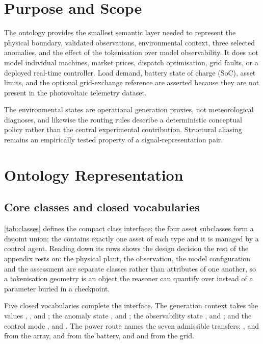 \section{Purpose and Scope}

The ontology provides the smallest semantic layer needed to represent the physical boundary, validated observations, environmental context, three selected anomalies, and the effect of the tokenisation over model observability. It does not model individual machines, market prices, dispatch optimisation, grid faults, or a deployed real-time controller. Load demand, battery state of charge (SoC), asset limits, and the optional grid-exchange reference are asserted because they are not present in the photovoltaic telemetry dataset.

The environmental states are operational generation proxies, not meteorological diagnoses, and likewise the routing rules describe a deterministic conceptual policy rather than the central experimental contribution. Structural aliasing remains an empirically tested property of a signal-representation pair.

\section{Ontology Representation}

\subsection{Core classes and closed vocabularies}

\autoref{tab:classes} defines the compact class interface: the four asset subclasses form a disjoint union; the  contains exactly one asset of each type and it is managed by a control agent. Reading down its rows shows the design decision the rest of the appendix rests on: the physical plant, the observation, the model configuration and the assessment are separate classes rather than attributes of one another, so a tokenisation geometry is an object the reasoner can quantify over instead of a parameter buried in a checkpoint.



Five closed vocabularies complete the interface. The generation context takes the values , ,  and ; the anomaly state ,  and ; the observability state ,  and ; and the control mode ,  and . The power route names the seven admissible transfers: ,  and  from the array,  and  from the battery, and  and  from the grid.

